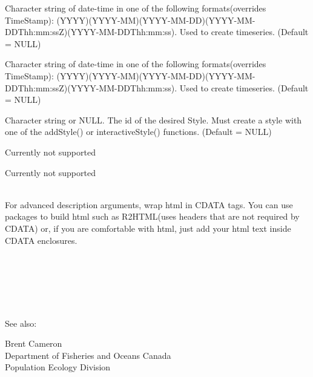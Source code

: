 \documentclass[a4paper]{book}
\begin{document}
\begin{Arguments}
\begin{ldescription}
\item[\code{TimeSpanStart}]  Character string of date-time in one of the following formats(overrides TimeStamp): (YYYY)(YYYY-MM)(YYYY-MM-DD)(YYYY-MM-DDThh:mm:ssZ)(YYYY-MM-DDThh:mm:ss). Used to create timeseries. (Default = NULL)
\item[\code{TimeSpanEnd}]  Character string of date-time in one of the following formats(overrides TimeStamp): (YYYY)(YYYY-MM)(YYYY-MM-DD)(YYYY-MM-DDThh:mm:ssZ)(YYYY-MM-DDThh:mm:ss). Used to create timeseries. (Default = NULL) 
\item[\code{styleUrl}] Character string or NULL. The id of the desired Style. Must create a style with one of the addStyle() or interactiveStyle() functions. (Default = NULL)
\item[\code{Region}] Currently not supported
\item[\code{ExtendedData}] Currently not supported

\end{ldescription}
\end{Arguments}
%
\begin{Note}\relax

\\{}
For advanced description arguments, wrap html in CDATA tags. You can use packages to build html such as R2HTML(uses headers that are not required by CDATA) or, if you are comfortable with html, just add your html text inside CDATA enclosures. \\{}
\code{text = ''<!\bsl{}[CDATA\bsl{}[ }\\{}
\\{}
\\{}
\\{}
\code{]]>''}\\{}
\\{}
See also: 

\end{Note}
%
\begin{Author}\relax
Brent Cameron \\{}
Department of Fisheries and Oceans Canada \\{}
Population Ecology Division 
\end{Author}
%
\begin{References}\relax
{} \\{}
\\{} 

\end{References}
\end{document}
